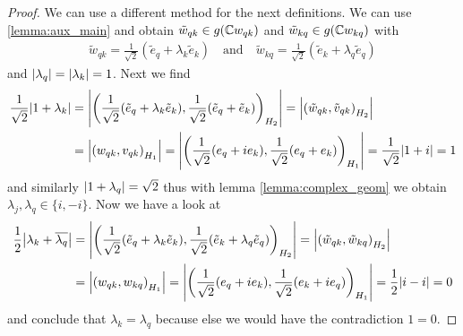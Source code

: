 \begin{proof}
	
	We can use a different method for the next definitions. We can use \ref{lemma:aux_main} and obtain $\tilde{w}_{qk} \in g(\mathbb{C} w_{qk})$ and $\tilde{w}_{kq} \in g(\mathbb{C} w_{kq})$ with
	\begin{align*}
		\tilde{w}_{qk} = \frac{1}{\sqrt{2}}(\tilde{e}_q + \lambda_k \tilde{e}_k) \quad \text{and} \quad \tilde{w}_{kq} = \frac{1}{\sqrt{2}}(\tilde{e}_k + \lambda_{q} \tilde{e}_q)
	\end{align*}
	and ${\left | \lambda_q \right |} = {\left | \lambda_k \right |} = 1$. Next we find
	\begin{align*}
		\frac{1}{\sqrt{2}}{\left | 1 + \lambda_k \right |} &= {\left | {\left ( \frac{1}{\sqrt{2}}(\tilde{e}_q + \lambda_k \tilde{e}_k), \frac{1}{\sqrt{2}} (\tilde{e}_q + \tilde{e}_k) \right )}_{H_2} \right |} = {\left | {\left ( \tilde{w}_{qk}, \tilde{v}_{qk} \right )}_{H_2} \right |} \\
		&= {\left | {\left ( w_{qk}, v_{qk} \right )}_{H_1} \right |} = {\left | {\left ( \frac{1}{\sqrt{2}}(e_q + ie_k), \frac{1}{\sqrt{2}} (e_q + e_k) \right )}_{H_1} \right |} = \frac{1}{\sqrt{2}} {\left | 1 + i \right |} = 1
	\end{align*}
	and similarly ${\left | 1 + \lambda_q \right |} = \sqrt{2}$ thus with lemma \ref{lemma:complex_geom} we obtain $\lambda_j, \lambda_q \in \{i, -i\}$. Now we have a look at
	\begin{align*}
		\frac{1}{2}{\left | \lambda_k + \overline{\lambda_q} \right |} &= {\left | {\left ( \frac{1}{\sqrt{2}}(\tilde{e}_q + \lambda_k \tilde{e}_k), \frac{1}{\sqrt{2}}(\tilde{e}_k + \lambda_{q} \tilde{e}_q) \right )}_{H_2} \right |} = {\left | {\left ( \tilde{w}_{qk}, \tilde{w}_{kq} \right )}_{H_2} \right |} \\
		&= {\left | {\left ( w_{qk}, w_{kq} \right )}_{H_1} \right |} = {\left | {\left ( \frac{1}{\sqrt{2}}(e_q + i e_k), \frac{1}{\sqrt{2}}(e_k + i e_q) \right )}_{H_1} \right |} = \frac{1}{2}{\left | i - i \right |} = 0
	\end{align*}
	and conclude that $\lambda_k = \lambda_q$ because else we would have the contradiction $1 = 0$. 
\end{proof}


